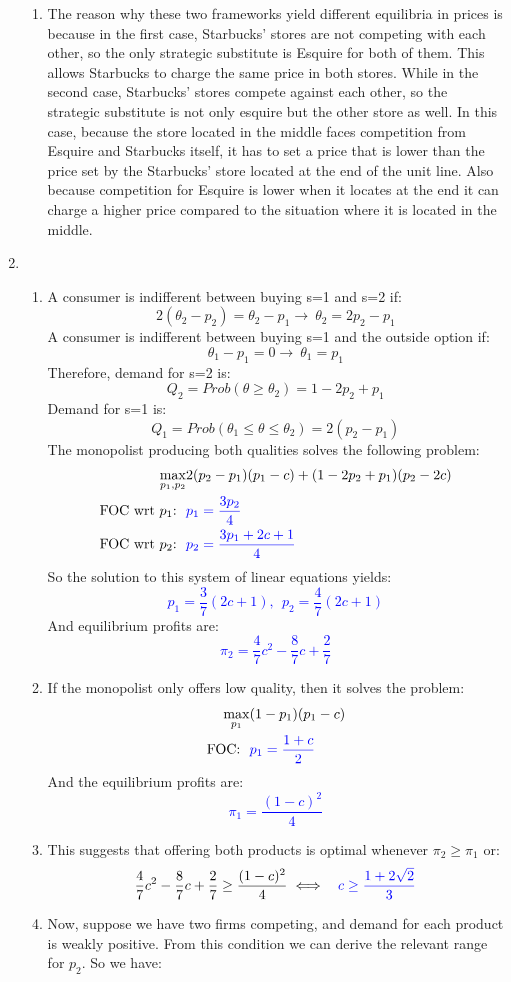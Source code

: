 \documentclass[12pt,english]{article}
\begin{document}
\begin{enumerate}
\begin{enumerate}
\item The reason why these two frameworks yield different equilibria in prices is because in the first case, Starbucks'  stores are not competing with each other,  so the only strategic substitute is Esquire for both of them. This allows Starbucks to charge the same price in both stores. While in the second case, Starbucks' stores compete against each other, so the strategic substitute is not only esquire but the other store as well. In this case, because the store located in the middle faces competition from Esquire and Starbucks itself, it has to set a price that is lower than the price set by the Starbucks' store located at the end of the unit line. Also because competition for Esquire is lower when it locates at the end it can charge a higher price compared to the situation where it is located in the middle.

\end{enumerate}

\item
\begin{enumerate}
\item A consumer is indifferent between buying s=1 and s=2 if:
\[
2(\theta_{2}-p_{2})=\theta_{2}-p_{1}\to \ \theta_{2}=2p_{2}-p_{1}
\]
A consumer is indifferent between buying s=1 and the outside option if:
\[
\theta_{1}-p_{1}=0\to \ \theta_{1}=p_{1}
\]
Therefore, demand for s=2 is:
\[
Q_{2}=Prob(\theta\geq\theta_{2})=1-2p_{2}+p_{1}
\]
Demand for s=1 is:
\[
Q_{1}=Prob(\theta_{1}\leq\theta\leq \theta_{2})=2(p_{2}-p_{1})
\]
The monopolist producing both qualities solves the following problem:
\begin{align}
\max_{p_{1},p_{2}}& 2(p_{2}-p_{1})(p_{1}-c)+(1-2p_{2}+p_{1})(p_{2}-2c)\nonumber\\
\mbox{FOC wrt $p_{1}$:}\ \ & \textcolor{blue}{p_{1}=\frac{3p_{2}}{4}}\nonumber\\
\mbox{FOC wrt $p_{2}$:}\ \ & \textcolor{blue}{p_{2}=\frac{3p_{1}+2c+1}{4}}\nonumber
\end{align}
So the solution to this system of linear equations yields:
\textcolor{blue}{
\[
p_{1}=\frac{3}{7}(2c+1),\ \ p_{2}=\frac{4}{7}(2c+1)
\]
}
And equilibrium profits are:
\textcolor{blue}{
\[
\pi_{2}=\frac{4}{7}c^{2}-\frac{8}{7}c+\frac{2}{7}
\]
}
\item If the monopolist only offers low quality, then it solves the problem:
\begin{align}
\max_{p_{1}}& (1-p_{1})(p_{1}-c)\nonumber\\
\mbox{FOC:}\ \ & \textcolor{blue}{p_{1}=\frac{1+c}{2}}\nonumber
\end{align}
And the equilibrium profits are:
\textcolor{blue}{
\[
\pi_{1}=\frac{(1-c)^{2}}{4}
\]
}
\item This suggests that offering both products is optimal whenever $\pi_{2}\geq\pi_{1}$ or:
\[
\frac{4}{7}c^{2}-\frac{8}{7}c+\frac{2}{7}\geq\frac{(1-c)^{2}}{4}\iff\ \ \textcolor{blue}{c\geq\frac{1+2\sqrt{2}}{3}}
\]
\item Now, suppose we have two firms competing, and demand for each product is weakly positive. From this condition we can derive the relevant range for $p_{2}$. So we have:


\end{enumerate}
\end{enumerate}
\end{document}
